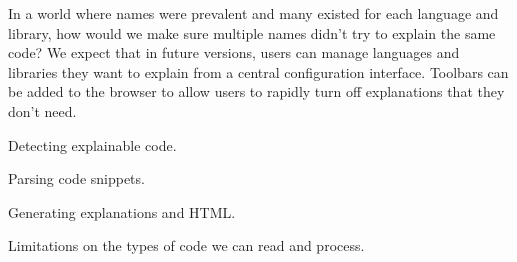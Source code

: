 In a world where \glspl{name} were prevalent and many existed for each language and library, how would we make sure multiple \glspl{name} didn't try to explain the same code?
We expect that in future versions, users can manage languages and libraries they want to explain from a central configuration interface.
Toolbars can be added to the browser to allow users to rapidly turn off explanations that they don't need.

Detecting explainable code.

Parsing code snippets.

Generating explanations and HTML.

Limitations on the types of code we can read and process.
